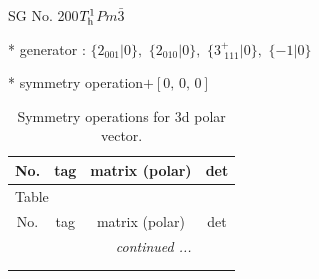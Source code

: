 \documentclass[fleqn,8pt]{jsarticle}
\begin{document}
\setcounter{MaxMatrixCols}{32}

\renewcommand{\tablename}{Table~}
\renewcommand{\figurename}{Figure~}
\begin{center}
\LARGE
SG No. 200\quad$T_{\rm h}^{1}$\quad$Pm\bar{3}$\quad[ cubic ]
\end{center}

* generator : $\{2{}_{001}|0\},\,\,\{2{}_{010}|0\},\,\,\{3^{+}_{\,\,111}|0\},\,\,\{-1|0\}$

* symmetry operation\quad$+\left[ 0,\, 0,\, 0 \right]$
\renewcommand{\arraystretch}{1.3}
\begin{longtable}{cccc}
\caption{Symmetry operations for 3d polar vector.}
 \\
 \hline \hline
No. & tag & matrix (polar) & det \\ \hline \endfirsthead

\multicolumn{3}{l}{\tablename\ \thetable{}} \\
 \hline \hline
No. & tag & matrix (polar) & det \\ \hline \endhead

 \hline \hline
\multicolumn{3}{r}{\footnotesize\it continued ...} \\ \endfoot

 \hline \hline
\multicolumn{3}{r}{} \\ \endlastfoot


\end{longtable}
\end{document}
